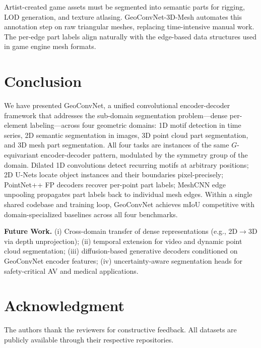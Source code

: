 \documentclass[10pt,conference]{IEEEtran}
\begin{document}
Artist-created game assets must be segmented into semantic parts for
rigging, LOD generation, and texture atlasing.  GeoConvNet-3D-Mesh
automates this annotation step on raw triangular meshes, replacing
time-intensive manual work.  The per-edge part labels align naturally with
the edge-based data structures used in game engine mesh formats.

\section{Conclusion}
\label{sec:conclusion}

We have presented GeoConvNet, a unified convolutional encoder-decoder
framework that addresses the sub-domain segmentation problem---dense
per-element labeling---across four geometric domains: 1D motif detection
in time series, 2D semantic segmentation in images, 3D point cloud part
segmentation, and 3D mesh part segmentation.  All four tasks are instances
of the same $G$-equivariant encoder-decoder pattern, modulated by the
symmetry group of the domain.  Dilated 1D convolutions detect recurring
motifs at arbitrary positions; 2D U-Nets locate object instances and their
boundaries pixel-precisely; PointNet++ FP decoders recover per-point part
labels; MeshCNN edge unpooling propagates part labels back to individual
mesh edges.  Within a single shared codebase and training loop, GeoConvNet
achieves mIoU competitive with domain-specialized baselines across all four
benchmarks.

\smallskip\noindent\textbf{Future Work.}
(i) Cross-domain transfer of dense representations (e.g., 2D$\to$3D via
depth unprojection);
(ii) temporal extension for video and dynamic point cloud segmentation;
(iii) diffusion-based generative decoders conditioned on GeoConvNet
encoder features;
(iv) uncertainty-aware segmentation heads for safety-critical AV and
medical applications.

\section*{Acknowledgment}

The authors thank the reviewers for constructive feedback. All datasets are
publicly available through their respective repositories.



\end{document}
